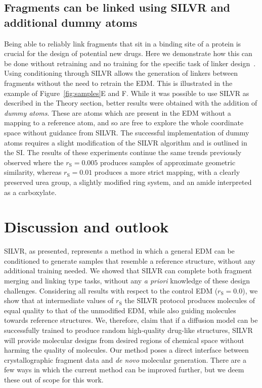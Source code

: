 \documentclass[journal=jacsat,manuscript=article]{achemso}
\begin{document}
\subsection{Fragments can be linked using SILVR and additional dummy atoms}
\label{sec:linker}
Being able to reliably link fragments that sit in a binding site of a protein is crucial for the design of potential new drugs. Here we demonstrate how this can be done  without retraining and no training for the specific task of linker design~\cite{huang20223dlinker,imrie2020deep}. Using conditioning through SILVR allows the generation of linkers between fragments without the need to retrain the EDM. This is illustrated in the example of Figure~\ref{fig:samples}E and F. While it was possible to use SILVR as described in the Theory section, better results were obtained with the addition of \textit{dummy atoms}. These are atoms which are present in the EDM without a mapping to a reference atom, and so are free to explore the whole coordinate space without guidance from SILVR. The successful implementation of dummy atoms requires a slight modification of the SILVR algorithm and is outlined in the SI. The results of these experiments continue the same trends previously observed where the $r_{\mathrm{S}}=0.005$ produces samples of approximate geometric similarity, whereas $r_{\mathrm{S}}=0.01$ produces a more strict mapping, with a clearly preserved urea group, a slightly modified ring system, and an amide interpreted as a carboxylate.

\section{Discussion and outlook}
\label{sec:discussion}
SILVR, as presented, represents a method in which a general EDM can be conditioned to generate samples that resemble a reference structure, without any additional training needed. We showed that SILVR can complete both fragment merging and linking type tasks, without any \textit{a priori} knowledge of these design challenges. Considering all results with respect to the control EDM ($r_{\mathrm{S}}=0.0$), we show that at intermediate values of $r_{\mathrm{S}}$ the SILVR protocol produces molecules of equal quality to that of the unmodified EDM, while also guiding molecules towards reference structures. We, therefore, claim that if a diffusion model can be successfully trained to produce random high-quality drug-like structures, SILVR will provide molecular designs from desired regions of chemical space without harming the quality of molecules. Our method poses a direct interface between crystallographic fragment data and \textit{de novo} molecular generation. There are a few ways in which the current method can be improved further, but we deem these out of scope for this work. 
\end{document}

